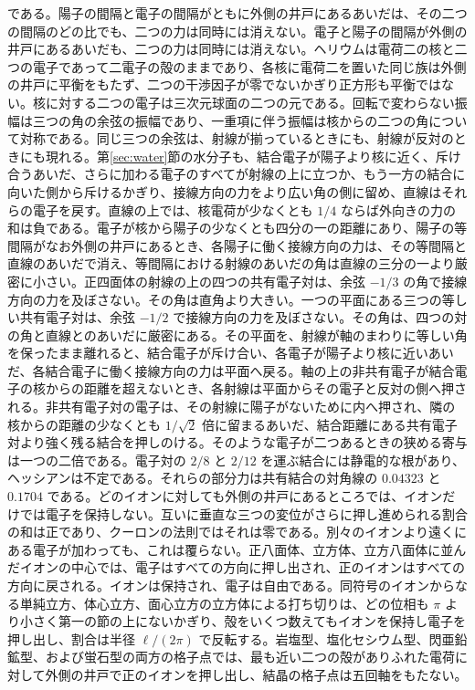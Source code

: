 \documentclass[a4paper]{article}
\begin{document}
である。陽子の間隔と電子の間隔がともに外側の井戸にあるあいだは、その二つの間隔のどの比でも、二つの力は同時には消えない。電子と陽子の間隔が外側の井戸にあるあいだも、二つの力は同時には消えない。ヘリウムは電荷二の核と二つの電子であって二電子の殻のままであり、各核に電荷二を置いた同じ族は外側の井戸に平衡をもたず、二つの干渉因子が零でないかぎり正方形も平衡ではない。核に対する二つの電子は三次元球面の二つの元である。回転で変わらない振幅は三つの角の余弦の振幅であり、一重項に伴う振幅は核からの二つの角について対称である。同じ三つの余弦は、射線が揃っているときにも、射線が反対のときにも現れる。第\ref{sec:water}節の水分子も、結合電子が陽子より核に近く、斥け合うあいだ、さらに加わる電子のすべてが射線の上に立つか、もう一方の結合に向いた側から斥けるかぎり、接線方向の力をより広い角の側に留め、直線はそれらの電子を戻す。直線の上では、核電荷が少なくとも \(1/4\) ならば外向きの力の和は負である。電子が核から陽子の少なくとも四分の一の距離にあり、陽子の等間隔がなお外側の井戸にあるとき、各陽子に働く接線方向の力は、その等間隔と直線のあいだで消え、等間隔における射線のあいだの角は直線の三分の一より厳密に小さい。正四面体の射線の上の四つの共有電子対は、余弦 \(-1/3\) の角で接線方向の力を及ぼさない。その角は直角より大きい。一つの平面にある三つの等しい共有電子対は、余弦 \(-1/2\) で接線方向の力を及ぼさない。その角は、四つの対の角と直線とのあいだに厳密にある。その平面を、射線が軸のまわりに等しい角を保ったまま離れると、結合電子が斥け合い、各電子が陽子より核に近いあいだ、各結合電子に働く接線方向の力は平面へ戻る。軸の上の非共有電子が結合電子の核からの距離を超えないとき、各射線は平面からその電子と反対の側へ押される。非共有電子対の電子は、その射線に陽子がないために内へ押され、隣の核からの距離の少なくとも \(1/\sqrt{2}\) 倍に留まるあいだ、結合距離にある共有電子対より強く残る結合を押しのける。そのような電子が二つあるときの狭める寄与は一つの二倍である。電子対の \(2/8\) と \(2/12\) を運ぶ結合には静電的な根があり、ヘッシアンは不定である。それらの部分力は共有結合の対角線の \(0.04323\) と \(0.1704\) である。どのイオンに対しても外側の井戸にあるところでは、イオンだけでは電子を保持しない。互いに垂直な三つの変位がさらに押し進められる割合の和は正であり、クーロンの法則ではそれは零である。別々のイオンより遠くにある電子が加わっても、これは覆らない。正八面体、立方体、立方八面体に並んだイオンの中心では、電子はすべての方向に押し出され、正のイオンはすべての方向に戻される。イオンは保持され、電子は自由である。同符号のイオンからなる単純立方、体心立方、面心立方の立方体による打ち切りは、どの位相も \(\pi\) より小さく第一の節の上にないかぎり、殻をいくつ数えてもイオンを保持し電子を押し出し、割合は半径 \(\ell/(2\pi)\) で反転する。岩塩型、塩化セシウム型、閃亜鉛鉱型、および蛍石型の両方の格子点では、最も近い二つの殻がありふれた電荷に対して外側の井戸で正のイオンを押し出し、結晶の格子点は五回軸をもたない。
\end{document}
